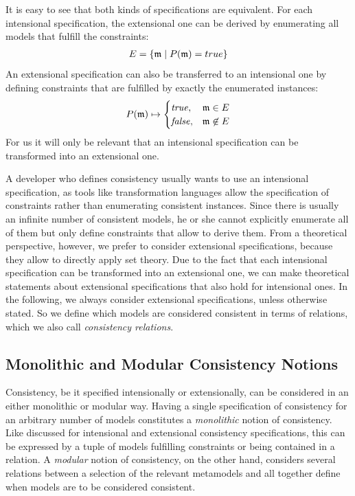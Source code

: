 It is easy to see that both kinds of specifications are equivalent. For each intensional specification, the extensional one can be derived by enumerating all models that fulfill the constraints:
\begin{align*}
    E = \setted{\modeltuple{m} \mid P(\modeltuple{m}) = true}
\end{align*}
An extensional specification can also be transferred to an intensional one by defining constraints that are fulfilled by exactly the enumerated instances:
\begin{align*}
    P(\modeltuple{m}) \mapsto 
    \begin{cases} 
        \truemath, & \modeltuple{m} \in E\\
        \falsemath, & \modeltuple{m} \not\in E\\
    \end{cases}
\end{align*}
For us it will only be relevant that an intensional specification can be transformed into an extensional one.

A developer who defines consistency usually wants to use an intensional specification, as tools like transformation languages allow the specification of constraints rather than enumerating consistent instances.
Since there is usually an infinite number of consistent models, he or she cannot explicitly enumerate all of them but only define constraints that allow to derive them.
From a theoretical perspective, however, we prefer to consider extensional specifications, because they allow to directly apply set theory.
Due to the fact that each intensional specification can be transformed into an extensional one, we can make theoretical statements about extensional specifications that also hold for intensional ones.
In the following, we always consider extensional specifications, unless otherwise stated.
So we define which models are considered consistent in terms of relations, which we also call \emph{consistency relations}.


\subsection{Monolithic and Modular Consistency Notions}
\label{chap:correctness:notions_consistency:monolithic_modular}

Consistency, be it specified intensionally or extensionally, can be considered in an either monolithic or modular way.
Having a single specification of consistency for an arbitrary number of models constitutes a \emph{monolithic} notion of consistency.
Like discussed for intensional and extensional consistency specifications, this can be expressed by a tuple of models fulfilling constraints or being contained in a relation.
A \emph{modular} notion of consistency, on the other hand, considers several relations between a selection of the relevant metamodels and all together define when models are to be considered consistent.

